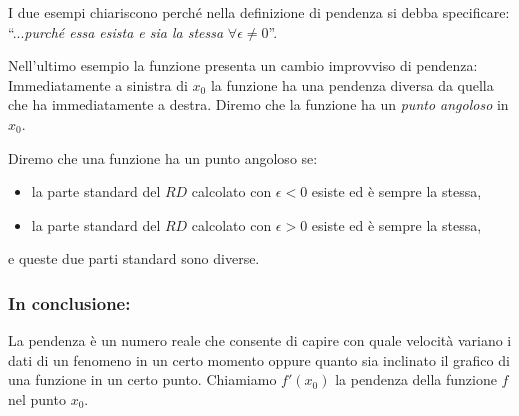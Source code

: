 I due esempi chiariscono perché nella definizione di pendenza si debba 
specificare: 
``...\textit{purché essa esista e sia la stessa} 
\(\forall \epsilon\ne 0\)''.

\bigskip
Nell'ultimo esempio la funzione presenta un cambio improvviso di pendenza:
Immediatamente a sinistra di \(x_0\) la funzione ha una pendenza diversa 
da quella che ha immediatamente a destra. 
Diremo che la funzione ha un \emph{punto angoloso} in \(x_0\).


\begin{definizione}
Diremo che una funzione ha un punto angoloso se: 
\begin{itemize} [nosep]
\item 
la parte standard del \(RD\) calcolato con 
\(\epsilon < 0\) esiste ed è sempre la stessa,
\item 
la parte standard del \(RD\) calcolato con 
\(\epsilon > 0\) esiste ed è sempre la stessa,
\end{itemize}
e queste due parti standard sono diverse.
\end{definizione}

\subsubsection{In conclusione:} 
La pendenza è un numero reale che consente di capire con quale 
velocità variano i dati di un fenomeno in un certo momento oppure quanto sia 
inclinato il grafico di una funzione in un certo punto.
Chiamiamo \(f'(x_0)\) la pendenza della funzione \(f\) nel punto \(x_0\).

